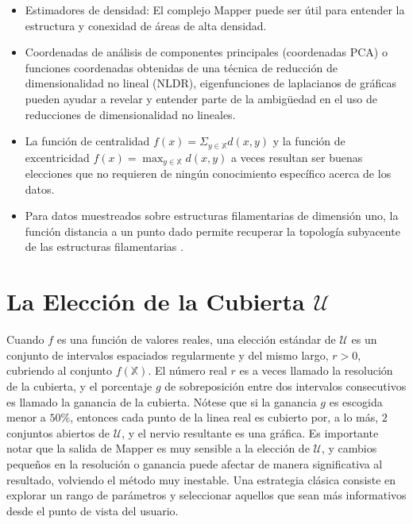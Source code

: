 \begin{itemize}
    \item Estimadores de densidad: El complejo Mapper puede ser \'util para entender la estructura y
    conexidad de \'areas de alta densidad.
    
    \item Coordenadas de an\'alisis de componentes principales (coordenadas PCA) o funciones coordenadas
    obtenidas de una t\'ecnica de reducci\'on de dimensionalidad no lineal (NLDR), eigenfunciones de
    laplacianos de gr\'aficas pueden ayudar a revelar y entender parte de la ambig\"uedad en el uso
    de reducciones de dimensionalidad no lineales.
    
    \item La funci\'on de centralidad $f\left(x\right) = \Sigma_{y\in\mathbb{X}}d\left(x,y\right)$ y la
    funci\'on de excentricidad $f\left(x\right) = \max_{y\in\mathbb{X}}d\left(x,y\right)$ a veces resultan
    ser buenas elecciones que no requieren de ning\'un conocimiento espec\'ifico acerca de los datos.
    
    \item Para datos muestreados sobre estructuras filamentarias de dimensi\'on uno, la funci\'on
    distancia a un punto dado permite recuperar la topolog\'ia subyacente de las estructuras filamentarias
    \cite{Chazal2015d}.
    
\end{itemize}

\section*{La Elecci\'on de la Cubierta $\mathcal{U}$}

Cuando $f$ es una funci\'on de valores reales, una elecci\'on est\'andar de $\mathcal{U}$
es un conjunto de intervalos espaciados regularmente y del mismo largo, $r>0$, cubriendo al conjunto
$f\left(\mathbb{X}\right)$. El n\'umero real $r$ es a veces llamado la resoluci\'on de
la cubierta, y el porcentaje $g$ de sobreposici\'on entre dos
intervalos consecutivos es llamado la ganancia de la cubierta.
N\'otese que si la ganancia $g$ es escogida menor a $50\%$, entonces cada punto de la linea real es
cubierto por, a lo m\'as, $2$ conjuntos abiertos de $\mathcal{U}$, y el nervio
resultante es una gr\'afica. Es importante notar que la salida de Mapper es muy
sensible a la elecci\'on de $\mathcal{U}$, y cambios
peque\~{n}os en la resoluci\'on o ganancia puede afectar de manera significativa al resultado, volviendo el
m\'etodo muy inestable. Una estrategia cl\'asica consiste en explorar un rango de par\'ametros y
seleccionar aquellos que sean m\'as informativos desde el punto de vista del usuario.

